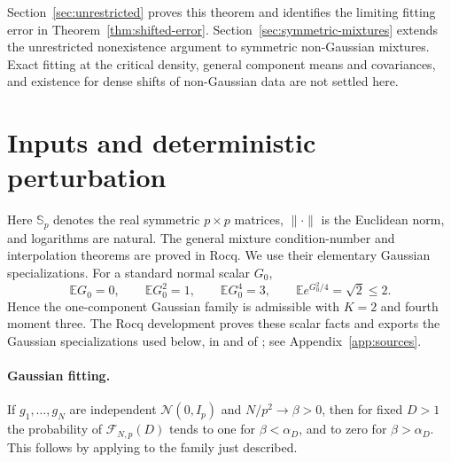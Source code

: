 \documentclass[11pt]{article}
\newcommand{\E}{\mathbb E}
\newcommand{\Sym}{\mathbb S}
\newcommand{\norm}[1]{\lVert#1\rVert}
\newcommand{\Fit}{\mathcal F}
\theoremstyle{remark}
\begin{document}
Section~\ref{sec:unrestricted} proves this theorem and identifies the
limiting fitting error in Theorem~\ref{thm:shifted-error}.
Section~\ref{sec:symmetric-mixtures} extends the unrestricted
nonexistence argument to symmetric non-Gaussian mixtures.
Exact fitting at the critical density, general component means and
covariances, and existence for dense shifts of non-Gaussian data are
not settled here.

\section{Inputs and deterministic perturbation}

Here $\Sym_p$ denotes the real symmetric $p\times p$ matrices,
$\norm\cdot$ is the Euclidean norm, and logarithms are natural.
The general mixture condition-number and interpolation theorems are
proved in Rocq. We use their elementary Gaussian specializations.
For a standard normal scalar $G_0$,
\begin{equation}\label{eq:normal-admissibility}
 \E G_0=0,\qquad \E G_0^2=1,\qquad \E G_0^4=3,
 \qquad \E e^{G_0^2/4}=\sqrt2\le2.
\end{equation}
Hence the one-component Gaussian family is admissible with $K=2$ and
fourth moment three. The Rocq development proves these scalar facts and
exports the Gaussian specializations used below, in
 and  of
; see Appendix~\ref{app:sources}.

\paragraph{Gaussian fitting.}
If $g_1,\ldots,g_N$ are independent $\mathcal N(0,I_p)$ and
$N/p^2\to\beta>0$, then for fixed $D>1$ the probability of
$\Fit_{N,p}(D)$ tends to one for $\beta<\alpha_D$, and to zero for
$\beta>\alpha_D$. This follows by applying
 to the family just described.
\end{document}
